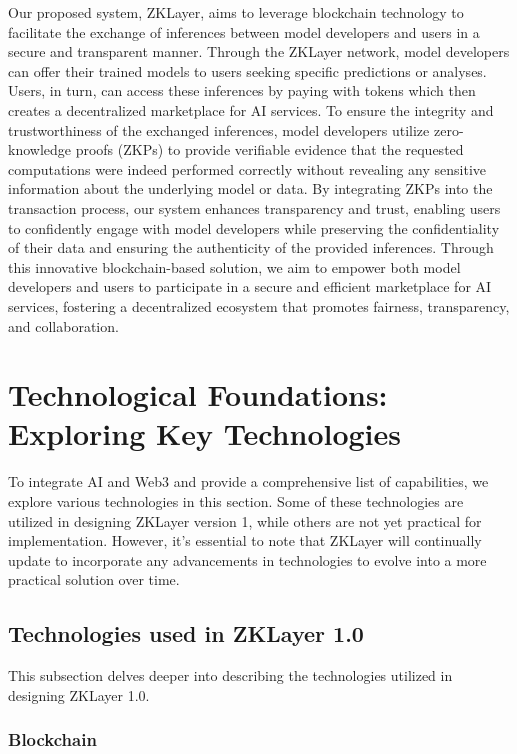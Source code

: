 \documentclass[conference]{IEEEtran}
\begin{document}
Our proposed system, ZKLayer, aims to leverage blockchain technology to facilitate the exchange of inferences between model developers and users in a secure and transparent manner. Through the ZKLayer network, model developers can offer their trained models to users seeking specific predictions or analyses. Users, in turn, can access these inferences by paying with tokens which then creates a decentralized marketplace for AI services. To ensure the integrity and trustworthiness of the exchanged inferences, model developers utilize zero-knowledge proofs (ZKPs) to provide verifiable evidence that the requested computations were indeed performed correctly without revealing any sensitive information about the underlying model or data. By integrating ZKPs into the transaction process, our system enhances transparency and trust, enabling users to confidently engage with model developers while preserving the confidentiality of their data and ensuring the authenticity of the provided inferences. Through this innovative blockchain-based solution, we aim to empower both model developers and users to participate in a secure and efficient marketplace for AI services, fostering a decentralized ecosystem that promotes fairness, transparency, and collaboration.

\section{Technological Foundations: Exploring Key Technologies}
To integrate AI and Web3 and provide a comprehensive list of capabilities, we explore various technologies in this section. Some of these technologies are utilized in designing ZKLayer version 1, while others are not yet practical for implementation. However, it's essential to note that ZKLayer will continually update to incorporate any advancements in technologies to evolve into a more practical solution over time.

\subsection{Technologies used in ZKLayer 1.0}

This subsection delves deeper into describing the technologies utilized in designing ZKLayer 1.0.

\subsubsection{Blockchain}
\end{document}
